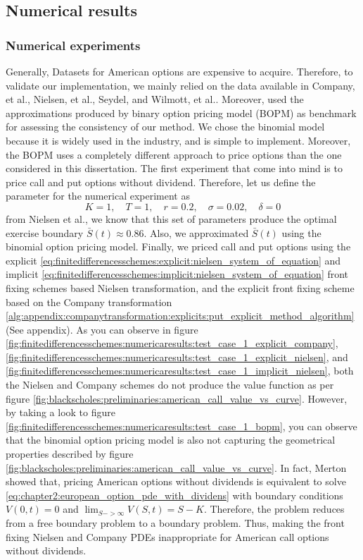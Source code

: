 \subsection{Numerical results}
\subsubsection{Numerical experiments} \label{sec:finitediferencesschemes:numericalresults:numericalexperiments}
Generally, Datasets for American options are expensive to acquire. Therefore, to validate our implementation, we mainly relied on the data available in Company, 
et al.\cite*{company_egorova_jodar_2014}, Nielsen, et al.\cite*{nielsen_2001}, Seydel\cite*{seydel_2009}, and Wilmott, et al.\cite*{dewynne_howison_wilmott_howison_1995}. Moreover, used the approximations produced by binary option pricing model\cite{cox_1979} (BOPM)  as benchmark for assessing the consistency of our method. We chose the binomial model because it is widely used in the industry, and is simple to implement. Moreover, the BOPM uses a completely different approach to price options than the one considered in this dissertation. The first experiment that come into mind is to price call and put options without dividend. Therefore, let us define the parameter for the numerical experiment as
\begin{equation}
  \label{eq:numericaresults:parameters_set_1}
  K = 1, \quad T = 1, \quad r=0.2, \quad \sigma=0.02, \quad \delta = 0 
\end{equation}
from Nielsen et al.\cite{nielsen_2001}, we know that this set of parameters produce the optimal exercise boundary $\bar{S}(t) \approx 0.86$. Also, we approximated $\bar{S}(t)$ using the binomial option pricing model. Finally, we priced call and put options using the explicit  \eqref{eq:finitedifferencesschemes:explicit:nielsen_system_of_equation} and implicit \eqref{eq:finitedifferencesschemes:implicit:nielsen_system_of_equation} front fixing schemes based Nielsen transformation, and the explicit front fixing scheme based on the Company transformation \eqref{alg:appendix:companytransformation:explicits:put_explicit_method_algorithm} (See appendix). As you can observe in figure \eqref{fig:finitedifferencesschemes:numericaresults:test_case_1_explicit_company},
\eqref{fig:finitedifferencesschemes:numericaresults:test_case_1_explicit_nielsen}, and \eqref{fig:finitedifferencesschemes:numericaresults:test_case_1_implicit_nielsen},
both the Nielsen and Company schemes do not produce the value function as per figure \eqref{fig:blackscholes:preliminaries:american_call_value_vs_curve}. However, by taking a look to figure \eqref{fig:finitedifferencesschemes:numericaresults:test_case_1_bopm}, you can observe that the binomial option pricing model is also not capturing the geometrical properties described by figure \eqref{fig:blackscholes:preliminaries:american_call_value_vs_curve}. In fact, Merton\cite{merton_1973} showed that, pricing American options without dividends is equivalent to solve \eqref{eq:chapter2:european_option_pde_with_dividens} with boundary conditions $V(0, t)=0$ and $\lim_{S->\infty}V(S,t)=S-K$. Therefore, the problem reduces from a free boundary problem to a boundary problem. Thus, making the front fixing Nielsen and Company PDEs inappropriate for American call options without dividends.

